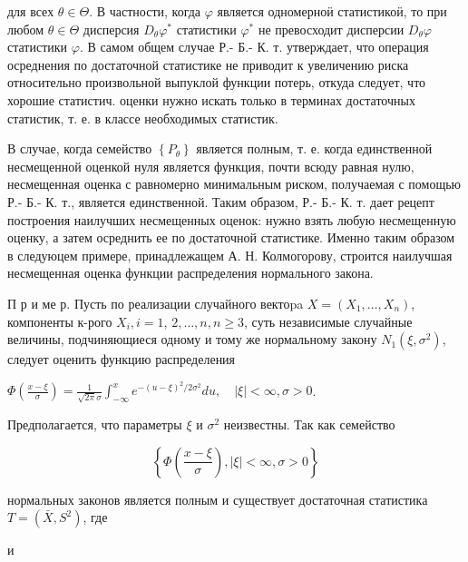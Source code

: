 \documentclass[10pt]{article}
\begin{document}
для всех $\theta \in \Theta$. В частности, когда $\varphi$ является одномерноӥ статистикоӥ, то при любом $\theta \in \Theta$ дисперсия $D_{\theta} \varphi^{*}$ статистики $\varphi^{*}$ не превосходит дисперсии $D_{\theta} \varphi$ статистики $\varphi$. В самом общем случае Р.- Б.- К. т. утверждает, что операция осреднения по достаточной статистике не приводит к увеличению риска относительно произвольной выпуклой функции потерь, откуда следует, что хорошие статистич. оценки нужно искать только в терминах достаточных статистик, т. е. в классе необходимых статистик.



В случае, когда семейство $\left\{P_{\theta}\right\}$ является полным, т. е. когда единственной несмещенной оценкой нуля является функция, почти всюду равная нулю, несмещенная оценка с равномерно минимальным риском, получаемая с помощью Р.- Б.- К. т., является единственной. Таким образом, Р.- Б.- К. т. дает рецепт построения наилучших несмещенных оценок: нужно взять любую несмещенную оценку, а затем осреднить ее по достаточной статистике. Именно таким образом в следуюцем примере, принадлежащем А. Н. Колмогорову, строится наилучшая несмещенная оценка функции распределения нормального закона.



П р и ме р. Пусть по реализации случайного вектоpa $X=\left(X_{1}, \ldots, X_{n}\right)$, компоненты к-рого $X_{i}, i=1$, $2, \ldots, n, n \geqslant 3$, суть независимые случайные величины, подчиняющиеся одному и тому же нормальному закону $N_{1}\left(\xi, \sigma^{2}\right)$, следует оценить функцию распределения



$\Phi\left(\frac{x-\xi}{\sigma}\right)=\frac{1}{\sqrt{2 \pi} \sigma} \int_{-\infty}^{x} e^{-(u-\xi)^{2} / 2 \sigma^{2}} d u, \quad|\xi|<\infty, \sigma>0$.



Предполагается, что параметры $\xi$ и $\sigma^{2}$ неизвестны. Так как семейство



\[

\left\{\Phi\left(\frac{x-\xi}{\sigma}\right),|\xi|<\infty, \sigma>0\right\}

\]



нормальных законов является полным и существует достаточная статистика $T=\left(\bar{X}, S^{2}\right)$, где



и
\end{document}
